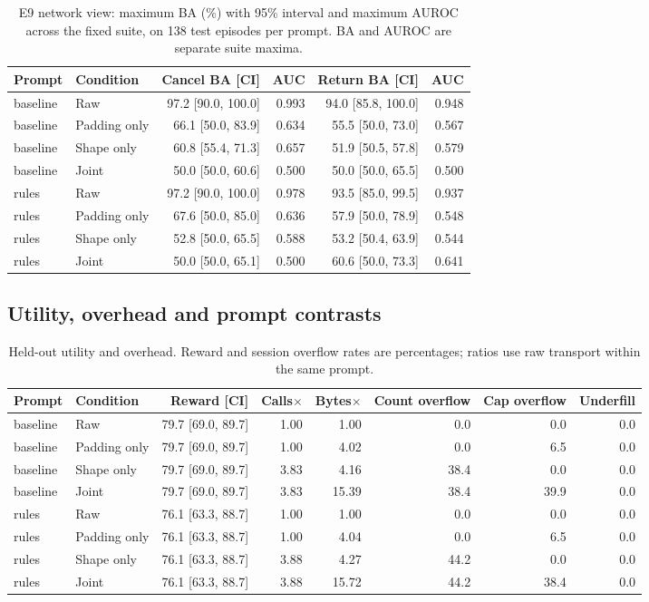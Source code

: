 \begin{table}[ht]\centering\small
\caption{E9 network view: maximum BA (\%) with 95\% interval and maximum AUROC across the fixed suite, on 138 test episodes per prompt. BA and AUROC are separate suite maxima.}
\begin{tabular}{@{}llrrrr@{}}\toprule
Prompt & Condition & Cancel BA [CI] & AUC & Return BA [CI] & AUC\\\midrule
baseline & Raw & 97.2 [90.0, 100.0] & 0.993 & 94.0 [85.8, 100.0] & 0.948\\
baseline & Padding only & 66.1 [50.0, 83.9] & 0.634 & 55.5 [50.0, 73.0] & 0.567\\
baseline & Shape only & 60.8 [55.4, 71.3] & 0.657 & 51.9 [50.5, 57.8] & 0.579\\
baseline & Joint & 50.0 [50.0, 60.6] & 0.500 & 50.0 [50.0, 65.5] & 0.500\\
rules & Raw & 97.2 [90.0, 100.0] & 0.978 & 93.5 [85.0, 99.5] & 0.937\\
rules & Padding only & 67.6 [50.0, 85.0] & 0.636 & 57.9 [50.0, 78.9] & 0.548\\
rules & Shape only & 52.8 [50.0, 65.5] & 0.588 & 53.2 [50.4, 63.9] & 0.544\\
rules & Joint & 50.0 [50.0, 65.1] & 0.500 & 60.6 [50.0, 73.3] & 0.641\\
\bottomrule\end{tabular}\end{table}

\subsection{Utility, overhead and prompt contrasts}

\begin{table}[ht]\centering\small
\caption{Held-out utility and overhead. Reward and session overflow rates are percentages; ratios use raw transport within the same prompt.}
\begin{tabular}{@{}llrrrrrr@{}}\toprule
Prompt & Condition & Reward [CI] & Calls$\times$ & Bytes$\times$ & Count overflow & Cap overflow & Underfill\\\midrule
baseline & Raw & 79.7 [69.0, 89.7] & 1.00 & 1.00 & 0.0 & 0.0 & 0.0\\
baseline & Padding only & 79.7 [69.0, 89.7] & 1.00 & 4.02 & 0.0 & 6.5 & 0.0\\
baseline & Shape only & 79.7 [69.0, 89.7] & 3.83 & 4.16 & 38.4 & 0.0 & 0.0\\
baseline & Joint & 79.7 [69.0, 89.7] & 3.83 & 15.39 & 38.4 & 39.9 & 0.0\\
rules & Raw & 76.1 [63.3, 88.7] & 1.00 & 1.00 & 0.0 & 0.0 & 0.0\\
rules & Padding only & 76.1 [63.3, 88.7] & 1.00 & 4.04 & 0.0 & 6.5 & 0.0\\
rules & Shape only & 76.1 [63.3, 88.7] & 3.88 & 4.27 & 44.2 & 0.0 & 0.0\\
rules & Joint & 76.1 [63.3, 88.7] & 3.88 & 15.72 & 44.2 & 38.4 & 0.0\\
\bottomrule\end{tabular}\end{table}


